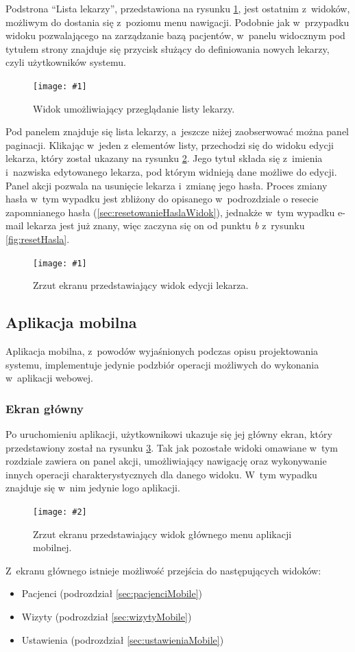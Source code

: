 \documentclass[11pt]{aghdpl}
\newcommand{\fullWidthPicture}[2]{
\begin{figure}[h!]
	\centering
		\texttt{[image: \#1]}
	\caption{#2}
	\label{fig:#1}
\end{figure}
}
\newcommand{\customWidthPicture}[3]{
\begin{figure}[h!]
	\centering
		\texttt{[image: \#2]}
	\caption{#3}
	\label{fig:#2}
\end{figure}
}
\begin{document}
Podstrona ``Lista lekarzy'', przedstawiona na rysunku \ref{fig:lekarze}, jest ostatnim z~widoków, możliwym do dostania się z~poziomu menu nawigacji. Podobnie jak w~przypadku widoku pozwalającego na zarządzanie bazą pacjentów, w~panelu widocznym pod tytułem strony znajduje się przycisk służący do definiowania nowych lekarzy, czyli użytkowników systemu.

\fullWidthPicture{lekarze}{Widok umożliwiający przeglądanie listy lekarzy.}

Pod panelem znajduje się lista lekarzy, a~jeszcze niżej zaobserwować można panel paginacji. Klikając w~jeden z elementów listy, przechodzi się do widoku edycji lekarza, który został ukazany na rysunku \ref{fig:lekarz}. Jego tytuł składa się z~imienia i~nazwiska edytowanego lekarza, pod którym widnieją dane możliwe do edycji. Panel akcji pozwala na usunięcie lekarza i~zmianę jego hasła. Proces zmiany hasła w~tym wypadku jest zbliżony do opisanego w~podrozdziale o resecie zapomnianego hasła (\ref{sec:resetowanieHaslaWidok}), jednakże w~tym wypadku e-mail lekarza jest już znany, więc zaczyna się on od punktu \emph{b} z~rysunku \ref{fig:resetHasla}.

\fullWidthPicture{lekarz}{Zrzut ekranu przedstawiający widok edycji lekarza.}

\subsection{Aplikacja mobilna}

Aplikacja mobilna, z~powodów wyjaśnionych podczas opisu projektowania systemu, implementuje jedynie podzbiór operacji możliwych do wykonania w~aplikacji webowej.

\subsubsection{Ekran główny}
\label{sec:ekranGlownyMobile}

Po uruchomieniu aplikacji, użytkownikowi ukazuje się jej główny ekran, który przedstawiony został na rysunku \ref{fig:ekranGlownyMobile}. Tak jak pozostałe widoki omawiane w~tym rozdziale zawiera on panel akcji, umożliwiający nawigację oraz wykonywanie innych operacji charakterystycznych dla danego widoku. W~tym wypadku znajduje się w~nim jedynie logo aplikacji.

\customWidthPicture{.3}{ekranGlownyMobile}{Zrzut ekranu przedstawiający widok głównego menu aplikacji mobilnej.}

Z~ekranu głównego istnieje możliwość przejścia do następujących widoków:
\begin{itemize}
\item Pacjenci (podrozdział \ref{sec:pacjenciMobile})
\item Wizyty (podrozdział \ref{sec:wizytyMobile})
\item Ustawienia (podrozdział \ref{sec:ustawieniaMobile})
\end{itemize}
\end{document}
